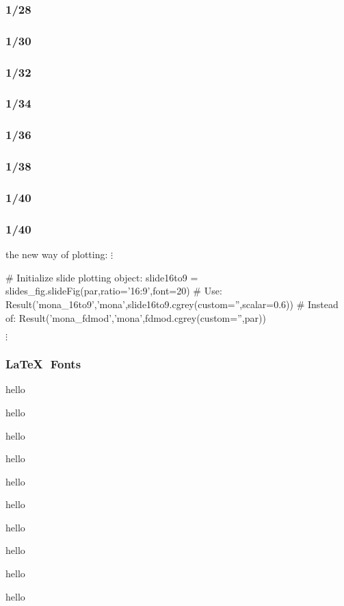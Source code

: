 \begin{frame}\frametitle{1/28}
\end{frame}

\begin{frame}\frametitle{1/30}
\end{frame}

\begin{frame}\frametitle{1/32}
\end{frame}

\begin{frame}\frametitle{1/34}
\end{frame}

\begin{frame}\frametitle{1/36}
\end{frame}

\begin{frame}\frametitle{1/38}
\end{frame}

\begin{frame}\frametitle{1/40}
\end{frame}


\begin{frame}\frametitle{1/40}
\end{frame}
\usebackgroundtemplate{}

\begin{frame}
\end{frame}
\begin{frame}[fragile]{the new way of plotting:}
\centering
$\vdots$
\begin{python}
# Initialize slide plotting object:
slide16to9 = slides_fig.slideFig(par,ratio='16:9',font=20) 
# Use:
Result('mona_16to9','mona',slide16to9.cgrey(custom='',scalar=0.6)) 
# Instead of:
Result('mona_fdmod','mona',fdmod.cgrey(custom='',par))
\end{python}
$\vdots$

\end{frame}


\usebackgroundtemplate{}
\begin{frame}\frametitle{\LaTeX$\text{ }$Fonts}
\centering
\tiny hello

\scriptsize hello

\footnotesize hello

\small hello

\normalsize hello

\large hello

\Large hello

\LARGE hello

\huge hello

\centering
\Huge hello

\end{frame}






